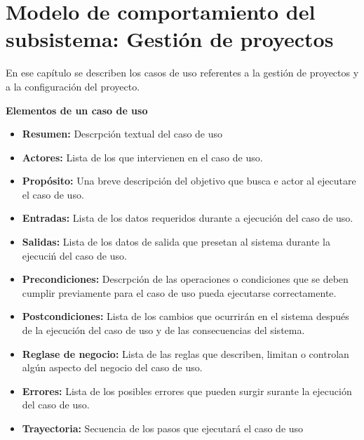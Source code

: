 \chapter{Modelo de comportamiento del subsistema: Gestión de proyectos}
\label{cap:reqSist}

En ese capítulo se describen los casos de uso referentes a la gestión de proyectos y a la configuración del proyecto.


\begin{shaded}
		\textcolor{NavyBlue}{\Large\textbf{Elementos de un caso de uso}}
		\begin{itemize}
			\item \textbf{Resumen:} Descrpción textual del caso de uso
			\item \textbf{Actores:} Lista de los que  intervienen en el caso de uso.
			\item \textbf{Propósito:} Una breve descripción del objetivo que busca e actor al ejecutare el caso de uso.
			\item \textbf{Entradas:} Lista de los datos requeridos durante a ejecución del caso de uso.
			\item \textbf{Salidas:} Lista de los datos de salida que presetan al sistema durante la ejecuciń del caso de uso.
			\item \textbf{Precondiciones:} Descrpción de las operaciones o condiciones que se deben cumplir previamente para el caso de uso pueda ejecutarse correctamente.
			\item \textbf{Postcondiciones:} Lista de los cambios que ocurrirán en el sistema después de la ejecución del caso de uso y de las consecuencias del sistema.
			\item \textbf{Reglase de negocio:} Lista de las reglas que describen, limitan o controlan algún aspecto del negocio del caso de uso.
			\item \textbf{Errores:} Lista de los posibles errores que pueden surgir surante la ejecución del caso de uso.
			\item \textbf{Trayectoria:} Secuencia de los pasos que ejecutará el caso de uso
		\end{itemize}		
	\end{shaded}
\newpage






